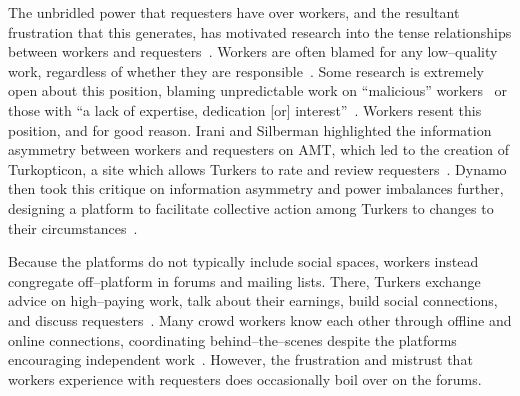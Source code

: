 \documentclass[pn4226]{subfiles}
\begin{document}
The unbridled power that requesters have over workers, and
the resultant frustration that this generates,
has motivated research into
the tense relationships between workers and requesters~\cite{fixingChaos,dynamo}.
Workers are often blamed for any low--quality work, regardless of whether they are responsible~\cite{martin2014being,takingAHITMcInnis}.
Some research is extremely open about this position, blaming unpredictable work on ``malicious'' workers~\cite{MaliciousCrowdworkersGadiraju} or those with ``a lack of expertise, dedication [or] interest''~\cite{Sheng:2008:GLI:1401890.1401965}.
Workers resent this position, and for good reason.
Irani and Silberman highlighted the information asymmetry between workers and requesters on AMT,
which led to the creation of Turkopticon, a site which allows Turkers to rate and review requesters~\cite{turkopticon}.
Dynamo then took this critique on information asymmetry and power imbalances further, designing a platform to facilitate
collective action among Turkers to changes to their circumstances~\cite{dynamo}.


Because the platforms do not typically include social spaces, workers instead congregate off--platform in forums and mailing lists.
There, Turkers exchange advice on high--paying work, talk about their earnings, build social connections, and discuss requesters~\cite{martin2014being}.
Many crowd workers know each other through offline and online connections, coordinating behind--the--scenes despite the platforms encouraging independent work~\cite{crowdcollab,yin2016communication}.
However, the frustration and mistrust that workers experience with requesters does occasionally boil over on the forums. 


\subsubsection{\pieceworkpers}

\begin{comment}
notes: what info do i assume the reader has seen already?
- Clark: pieceworkers work harder, more diligently, etc...
- Riis saw terrible conditions, documented and communicated it to the world
- Worker advocacy groups arose to speak out against piecework
\end{comment}
\end{document}
